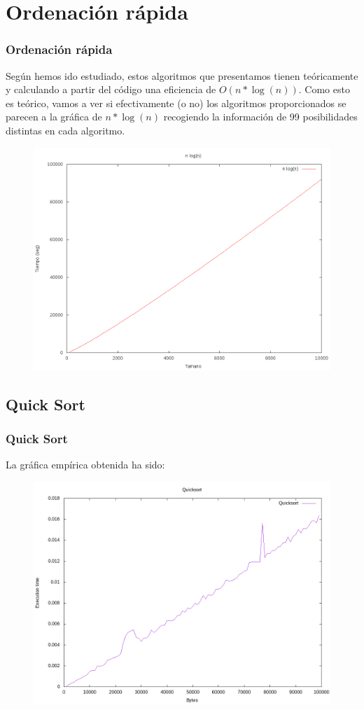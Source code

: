 \documentclass{beamer}
\begin{document}
\section{Ordenación rápida} %
\begin{frame}
	\frametitle{Ordenación rápida}
	Según hemos ido estudiado, estos algoritmos que presentamos tienen teóricamente y calculando a partir del código una eficiencia de $O(n*\log(n) )$. Como esto es teórico, vamos a ver si efectivamente (o no) los algoritmos proporcionados se parecen a la gráfica de $n*\log(n)$ recogiendo la información de 99 posibilidades distintas en cada algoritmo.
	\begin{figure} [H]
		\centering
		\includegraphics[width=0.5\linewidth]{imagenes/nlog(n)3.png}
		\caption{}
		\label{fig:E1}
	\end{figure}
	
\end{frame}
\subsection{Quick Sort}
\begin{frame}
	\frametitle{Quick Sort}
	La gráfica empírica obtenida ha sido:
	\begin{figure}
		\centering
		\includegraphics[width=0.7\linewidth]{imagenes/quicksort.png}
		\caption{}
		\label{fig:E4}
	\end{figure}
	
\end{frame}
\end{document}
